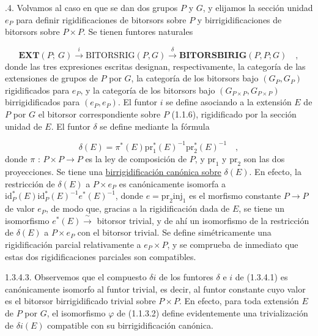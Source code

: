 \par\medskip{}.4.  Volvamos al caso en que se dan dos grupos $P$ y $G$, y
elijamos la sección unidad $e_P$ para definir rigidificaciones de
bitorsors sobre $P$ y birrigidificaciones de bitorsors sobre
$P\times P$. Se tienen funtores naturales

\begin{equation}\tag{1.3.4.1}
\mathbf{EXT}(P;\ G) \xrightarrow{\ i\ } \mathrm{BITORSRIG}(P,G) \xrightarrow{\ \delta\ } \mathbf{BITORSBIRIG}(P,P;G) \quad ,
\end{equation}
donde las tres expresiones escritas designan, respectivamente, la
categoría de las extensiones de grupos de $P$ por $G$, la categoría de
los bitorsors bajo $(G_P,G_P)$ rigidificados para $e_P$, y la categoría
de los bitorsors bajo $(G_{P\times P},G_{P\times P})$ birrigidificados
para $(e_P,e_P)$. El funtor $i$ se define asociando a la extensión $E$
de $P$ por $G$ el bitorsor correspondiente sobre $P$ (1.1.6),
rigidificado por la sección unidad de $E$. El funtor $\delta$ se define
mediante la fórmula

\begin{equation}\tag{1.3.4.2}
\delta(E) = \pi^*(E)\mathrm{pr}_1^*(E)^{-1}\mathrm{pr}_2^*(E)^{-1} \quad ,
\end{equation}
donde $\pi$ : $P\times P \longrightarrow P$ es la ley de composición
de $P$, y $\mathrm{pr}_1$ y $\mathrm{pr}_2$ son las dos proyecciones.
Se tiene una \underline{birrigidificación canónica sobre} $\delta(E)$.
En efecto, la restricción de $\delta(E)$ a $P\times e_P$ es
canónicamente isomorfa a
$\mathrm{id}_P^*(E)\mathrm{id}_P^*(E)^{-1}e^*(E)^{-1}$, donde
$e = \mathrm{pr}_2\mathrm{inj}_1$ es el morfismo constante
$P \longrightarrow P$ de valor $e_P$, de modo que, gracias a la
rigidificación dada de $E$, se tiene un isomorfismo
$e^*(E) \xrightarrow{\ \sim\ }$ bitorsor trivial, y de ahí un
isomorfismo de la restricción de $\delta(E)$ a $P\times e_P$ con el
bitorsor trivial. Se define simétricamente una rigidificación parcial
relativamente a $e_P\times P$, y se comprueba de inmediato que estas
dos rigidificaciones parciales son compatibles.



1.3.4.3.  Observemos que el compuesto $\delta i$ de los funtores
$\delta$ e $i$ de (1.3.4.1) es canónicamente isomorfo al funtor
trivial, es decir, al funtor constante cuyo valor es el bitorsor
birrigidificado trivial sobre $P\times P$. En efecto, para toda
extensión $E$ de $P$ por $G$, el isomorfismo $\varphi$ de (1.1.3.2)
define evidentemente una trivialización de $\delta i(E)$ compatible
con su birrigidificación canónica.
